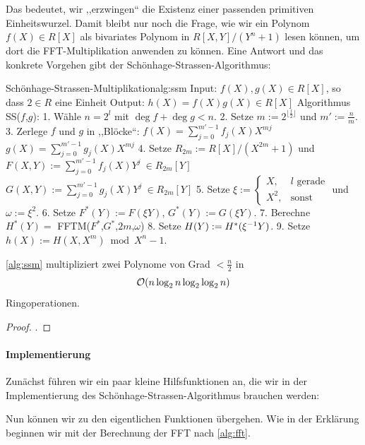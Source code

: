 Das bedeutet, wir ,,erzwingen`` die Existenz einer passenden primitiven
Einheitswurzel. Damit bleibt nur noch die Frage, wie wir ein Polynom 
$f(X) \in R[X]$ als bivariates Polynom in $R[X,Y]\big/(Y^n+1)$ lesen können, um
dort die FFT-Multiplikation anwenden zu können. Eine Antwort und das konkrete
Vorgehen gibt der Schönhage-Strassen-Algorithmus:

\begin{pseudocode}{Schönhage-Strassen-Multiplikation}{alg:ssm}
Input: $f(X),g(X) \in R[X]$, so dass $2 \in R$ eine Einheit
Output: $h(X) = f(X)g(X) \in R[X]$
Algorithmus SS($f$,$g$):
  1. Wähle $n = 2^l$ mit $\deg f + \deg g < n$.
  2. Setze $m := 2^{\lfloor\tfrac l 2\rfloor}$ und $m' := \tfrac n m$.
  3. Zerlege $f$ und $g$ in ,,Blöcke``:
     $f(X) = \sum_{j=0}^{m'-1} f_j(X) X^{mj}$
     $g(X) = \sum_{j=0}^{m'-1} g_j(X) X^{mj}$
  4. Setze $R_{2m} := R[X]\big/(X^{2m}+1)$ und 
     $F(X,Y) := \sum_{j=0}^{m'-1} f_j(X) Y^j\ \in R_{2m}[Y]$
     $G(X,Y) := \sum_{j=0}^{m'-1} g_j(X) Y^j\ \in R_{2m}[Y]$
  5. Setze $\xi := \begin{cases} X, & l \text{ gerade}\\ X^2, &
      \text{sonst}\end{cases}$ und $\omega := \xi^2$.
  6. Setze $F^\ast(Y) := F(\xi Y)$, $G^\ast(Y) := G(\xi Y)$.
  7. Berechne $H^\ast(Y) = $ FFTM($F^\ast$,$G^\ast$,$2m$,$\omega$)
  8. Setze $H(Y) := H^\ast(\xi^{-1} Y)$.
  9. Setze $h(X) := H(X,X^m) \bmod{X^n-1}$.
\end{pseudocode}

\begin{thm}
  \autoref{alg:ssm} multipliziert zwei Polynome von Grad $<\tfrac n 2$ in
  \[ \mathcal{O}(n\log_2 n\log_2\log_2 n) \]
  Ringoperationen.
\end{thm}
\begin{proof}
  \autocite[Algorithmus 4.18]{fft}.
\end{proof}

\paragraph{Implementierung}
Zunächst führen wir ein paar kleine Hilfsfunktionen an, die wir in der
Implementierung des Schönhage-Strassen-Algorithmus brauchen werden:

Nun können wir zu den eigentlichen Funktionen übergehen.
Wie in der Erklärung beginnen wir mit der Berechnung der FFT nach 
\autoref{alg:fft}.

